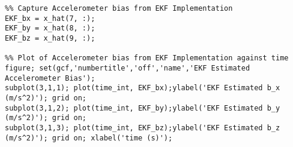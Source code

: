 \begin{lstlisting}
%% Capture Accelerometer bias from EKF Implementation
EKF_bx = x_hat(7, :); 
EKF_by = x_hat(8, :); 
EKF_bz = x_hat(9, :);

%% Plot of Accelerometer bias from EKF Implementation against time
figure; set(gcf,'numbertitle','off','name','EKF Estimated Accelerometer Bias');  
subplot(3,1,1); plot(time_int, EKF_bx);ylabel('EKF Estimated b_x (m/s^2)'); grid on;
subplot(3,1,2); plot(time_int, EKF_by);ylabel('EKF Estimated b_y (m/s^2)'); grid on;
subplot(3,1,3); plot(time_int, EKF_bz);ylabel('EKF Estimated b_z (m/s^2)'); grid on; xlabel('time (s)');
\end{lstlisting}
\label{fig:EKF2NED}
